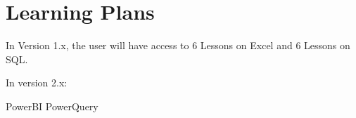 \section{Learning Plans}

In Version 1.x, the user will have access to 6 Lessons on Excel and 6 Lessons on SQL.

In version 2.x: 

PowerBI
PowerQuery

